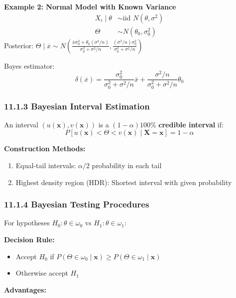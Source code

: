 \textbf{Example 2: Normal Model with Known Variance}
\[
\begin{aligned}
X_i \mid \theta &\sim \text{iid } N(\theta, \sigma^2) \\
\Theta &\sim N(\theta_0, \sigma_0^2)
\end{aligned}
\]
Posterior: $\Theta \mid \overline{x} \sim N\left(\frac{\overline{x}\sigma_0^2 + \theta_0(\sigma^2/n)}{\sigma_0^2 + \sigma^2/n}, \frac{(\sigma^2/n)\sigma_0^2}{\sigma_0^2 + \sigma^2/n}\right)$

Bayes estimator:
\[
\delta(\overline{x}) = \frac{\sigma_0^2}{\sigma_0^2 + \sigma^2/n} \overline{x} + \frac{\sigma^2/n}{\sigma_0^2 + \sigma^2/n} \theta_0
\]

\subsubsection{11.1.3 Bayesian Interval Estimation}

\begin{definition}
An interval $(u(\mathbf{x}), v(\mathbf{x}))$ is a $(1-\alpha)100\%$ \textbf{credible interval} if:
\[
P[u(\mathbf{x}) < \Theta < v(\mathbf{x}) \mid \mathbf{X} = \mathbf{x}] = 1-\alpha
\]
\end{definition}
\textbf{Construction Methods:}

\begin{enumerate}
	\item Equal-tail intervals: $\alpha/2$ probability in each tail
	\item Highest density region (HDR): Shortest interval with given probability
\end{enumerate}

\subsubsection{11.1.4 Bayesian Testing Procedures}

For hypotheses $H_0: \theta \in \omega_0$ vs $H_1: \theta \in \omega_1$:

\textbf{Decision Rule:}

\begin{itemize}
	\item Accept $H_0$ if $P(\Theta \in \omega_0 \mid \mathbf{x}) \geq P(\Theta \in \omega_1 \mid \mathbf{x})$
	\item Otherwise accept $H_1$
\end{itemize}

\textbf{Advantages:}

